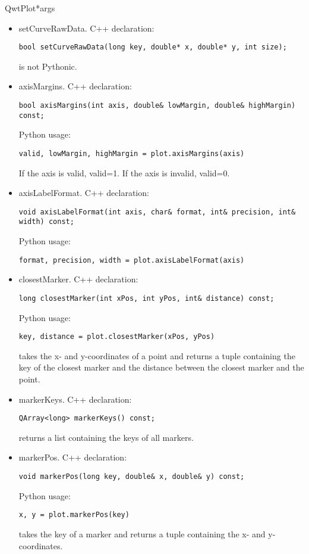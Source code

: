 \documentclass{manual}
\begin{document}
\begin{classdesc}{QwtPlot}{*args}
\begin{itemize}
    \item{setCurveRawData}. C++ declaration:
      \begin{verbatim}
bool setCurveRawData(long key, double* x, double* y, int size);
      \end{verbatim}
       is not Pythonic.

    \item{axisMargins}. C++ declaration:
      \begin{verbatim}
bool axisMargins(int axis, double& lowMargin, double& highMargin) const;
      \end{verbatim}
      Python usage:
      \begin{verbatim}
valid, lowMargin, highMargin = plot.axisMargins(axis)
      \end{verbatim}
      If the axis is valid, valid=1. If the axis is invalid, valid=0.

    \item{axisLabelFormat}. C++ declaration:
      \begin{verbatim}
void axisLabelFormat(int axis, char& format, int& precision, int& width) const;
      \end{verbatim}
      Python usage:
      \begin{verbatim}
format, precision, width = plot.axisLabelFormat(axis)
      \end{verbatim}

    \item{closestMarker}. C++ declaration:
      \begin{verbatim}
long closestMarker(int xPos, int yPos, int& distance) const;
      \end{verbatim}
      Python usage:
      \begin{verbatim}
key, distance = plot.closestMarker(xPos, yPos)
      \end{verbatim}
       takes the x- and y-coordinates of a point and
      returns a tuple containing the key of the closest marker and the distance
      between the closest marker and the point.

    \item{markerKeys}. C++ declaration:
      \begin{verbatim}
QArray<long> markerKeys() const;
      \end{verbatim}
       returns a list containing the keys of all markers.

    \item{markerPos}. C++ declaration:
      \begin{verbatim}
void markerPos(long key, double& x, double& y) const;
      \end{verbatim}
      Python usage:
      \begin{verbatim}
x, y = plot.markerPos(key)
      \end{verbatim}
       takes the key of a marker and returns a tuple containing
      the x- and y-coordinates.

  \end{itemize}
\end{classdesc}
\end{document}
